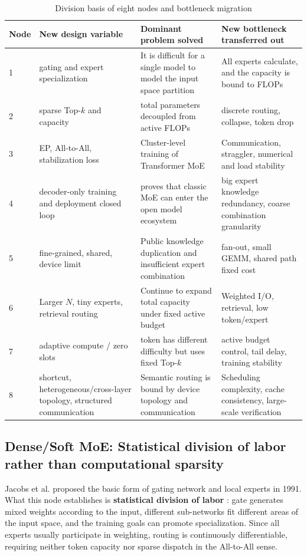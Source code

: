\documentclass[10pt,a4paper,fontset=none]{ctexart}
\newcommand{\term}[1]{\textbf{#1}}
\begin{document}
\begin{table}[htbp]
\centering
\caption{Division basis of eight nodes and bottleneck migration}
\label{en:tab:evolution-nodes}
\small
\begin{tabularx}{\textwidth}{p{}p{}p{}Y}
\toprule
Node & New design variable & Dominant problem solved & New bottleneck transferred out \\
 & gating and expert specialization & It is difficult for a single model to model the input space partition & All experts calculate, and the capacity is bound to FLOPs \\
2 & sparse Top-$k$ and capacity & total parameters decoupled from active FLOPs & discrete routing, collapse, token drop \\
3 & EP, All-to-All, stabilization loss & Cluster-level training of Transformer MoE & Communication, straggler, numerical and load stability \\
4 & decoder-only training and deployment closed loop & proves that classic MoE can enter the open model ecosystem & big expert knowledge redundancy, coarse combination granularity \\
5 & fine-grained, shared, device limit & Public knowledge duplication and insufficient expert combination & fan-out, small GEMM, shared path fixed cost \\
6 & Larger $N$, tiny experts, retrieval routing & Continue to expand total capacity under fixed active budget & Weighted I/O, retrieval, low token/expert \\
7 & adaptive compute / zero slots & token has different difficulty but uses fixed Top-$k$ & active budget control, tail delay, training stability \\
8 & shortcut, heterogeneous/cross-layer topology, structured communication & Semantic routing is bound by device topology and communication & Scheduling complexity, cache consistency, large-scale verification \\
\bottomrule
\end{tabularx}
\end{table}

\subsection{Dense/Soft MoE: Statistical division of labor rather than computational sparsity}

Jacobs et al. proposed the basic form \cite{en:jacobs1991adaptive} of gating network and local experts in 1991. What this node establishes is \term{ statistical division of labor }: gate generates mixed weights according to the input, different sub-networks fit different areas of the input space, and the training goals can promote specialization. Since all experts usually participate in weighting, routing is continuously differentiable, requiring neither token capacity nor sparse dispatch in the All-to-All sense.
\end{document}
